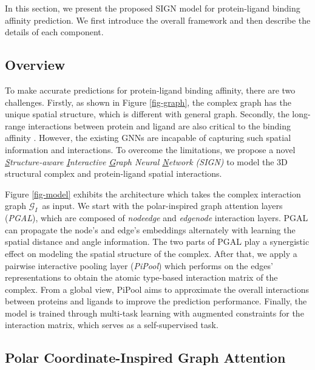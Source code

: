 \documentclass[sigconf]{acmart}
\newcommand{\model}{\textsf{SIGN}\xspace}
\newcommand{\gnn}{PGAL\xspace}
\newcommand{\pool}{PiPool\xspace}
\newcommand{\graph}{\ensuremath{\mathcal{G}_I}}
\newcommand{\dta}{protein-ligand binding affinity}
\begin{document}
In this section, we present the proposed \model{} model for protein-ligand binding affinity prediction. We first introduce the overall framework and then describe the details of each component.

\subsection{Overview}
To make accurate predictions for \dta, there are two challenges. Firstly, as shown in Figure \ref{fig-graph}, the complex graph has the unique spatial structure, which is different with general graph. Secondly, the long-range interactions between  protein and ligand are also critical to the binding affinity \cite{leckband1992long}. However, the existing GNNs are incapable of capturing such spatial information and interactions. To overcome the limitations, we propose a novel \textit{\underline{S}tructure-aware \underline{I}nteractive \underline{G}raph Neural \underline{N}etwork (\model)} to model the 3D structural complex and protein-ligand spatial interactions. 

Figure \ref{fig-model} exhibits the architecture which takes the complex interaction graph \graph \ as input. We start with the polar-inspired graph attention layers (\textit{\gnn}), which are composed of \textit{nodeedge} and \textit{edgenode} interaction layers. \gnn can propagate the node's and edge's embeddings alternately with learning the spatial distance and angle information. The two parts of \gnn play a synergistic effect on modeling the spatial structure of the complex. After that, we apply a pairwise interactive pooling layer (\textit{\pool}) which performs on the edges' representations to obtain the atomic type-based interaction matrix of the complex. From a global view, \pool aims to approximate the overall interactions between proteins and ligands to improve the prediction performance. Finally, the model is trained through multi-task learning with augmented constraints for the interaction matrix, which serves as a self-supervised task.


\subsection{Polar Coordinate-Inspired Graph Attention}
\end{document}
